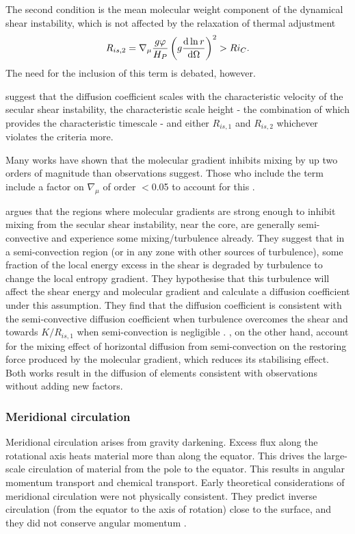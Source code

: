 The second condition is the mean molecular weight component of the dynamical shear instability, which is not affected by the relaxation of thermal adjustment
\begin{equation}
    R_{is,2} = \nabla_{\mu} \frac{g \varphi}{H_P}\left(g \frac{\textmd{d} \ln r}{\textmd{d} \Omega}\right)^2 > Ri_C.
\end{equation}
The need for the inclusion of this term is debated, however.

\citet{endal_evolution_1978} suggest that the diffusion coefficient scales with the characteristic velocity of the secular shear instability, the characteristic scale height - the combination of which provides the characteristic timescale - and either $R_{is,1}$ and $R_{is,2}$ whichever violates the criteria more.

Many works have shown that the molecular gradient inhibits mixing by up two orders of magnitude than observations suggest.
Those who include the term include a factor on $\nabla_{\mu}$ of order $<$0.05 to account for this \citep{charbonnel_lithium_1994,heger_presupernova_2000}.

\citet{maeder_stellar_1997} argues that the regions where molecular gradients are strong enough to inhibit mixing from the secular shear instability, near the core, are generally semi-convective and experience some mixing/turbulence already.
They suggest that in a semi-convection region (or in any zone with other sources of turbulence), some fraction of the local energy excess in the shear is degraded by turbulence to change the local entropy gradient. 
They hypothesise that this turbulence will affect the shear energy and molecular gradient and calculate a diffusion coefficient under this assumption. 
They find that the diffusion coefficient is consistent with the semi-convective diffusion coefficient when turbulence overcomes the shear and towards $K/R_{is,1}$ when semi-convection is negligible \citep[Consistent with the results of][]{zahn_circulation_1992}.
\citet{talon_anisotropic_1997}, on the other hand, account for the mixing effect of horizontal diffusion from semi-convection on the restoring force produced by the molecular gradient, which reduces its stabilising effect.
Both works result in the diffusion of elements consistent with observations without adding new factors.



\subsubsection{Meridional circulation}
Meridional circulation \citep{eddington_circulating_1925} arises from gravity darkening.
Excess flux along the rotational axis heats material more than along the equator.
This drives the large-scale circulation of material from the pole to the equator.
This results in angular momentum transport and chemical transport.
Early theoretical considerations of meridional circulation were not physically consistent.
They predict inverse circulation (from the equator to the axis of rotation) close to the surface, and they did not conserve angular momentum \citep{sweet_importance_1950, mestel_rotation_1953, mestel_star_1956, kippenhahn_stellar_1990}.


